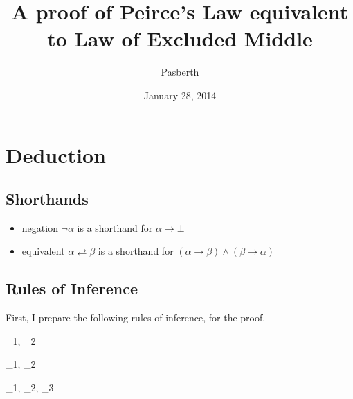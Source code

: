 \documentclass{article}
\title{A proof of Peirce's Law equivalent to Law of Excluded Middle}
\author{Pasberth}
\date{January 28, 2014}
\begin{document}
\maketitle

\tableofcontents

\section{Deduction}
\subsection{Shorthands}

\begin{itemize}
\item negation $\neg \alpha$ is a shorthand for $\alpha \rightarrow \bot$
\item equivalent $\alpha \rightleftarrows \beta$ is a shorthand for $(\alpha \rightarrow \beta) \land (\beta \rightarrow \alpha)$
\end{itemize}
\subsection{Rules of Inference}

First, I prepare the following rules of inference, for the proof.

{
  \Gamma \vdash \alpha \rightarrow \beta
}

{
  \Gamma_1, \Gamma_2 \vdash \beta
}

{
  \Gamma_1, \Gamma_2 \vdash \alpha \land \beta
}

{
  \Gamma \vdash \alpha
}

{
  \Gamma \vdash \beta
}

{
  \Gamma \vdash \alpha \lor \beta
}

{
  \Gamma \vdash \alpha \lor \beta
}

{
  \Gamma_1, \Gamma_2, \Gamma_3 \vdash \gamma
}
\end{document}
